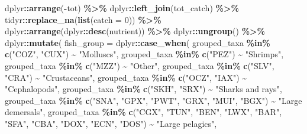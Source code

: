 \documentclass[
]{book}
\newenvironment{Shaded}{\begin{snugshade}}{\end{snugshade}}
\newcommand{\AttributeTok}[1]{\textcolor[rgb]{0.13,0.29,0.53}{#1}}
\newcommand{\DecValTok}[1]{\textcolor[rgb]{0.00,0.00,0.81}{#1}}
\newcommand{\FunctionTok}[1]{\textcolor[rgb]{0.13,0.29,0.53}{\textbf{#1}}}
\newcommand{\NormalTok}[1]{#1}
\newcommand{\SpecialCharTok}[1]{\textcolor[rgb]{0.81,0.36,0.00}{\textbf{#1}}}
\newcommand{\StringTok}[1]{\textcolor[rgb]{0.31,0.60,0.02}{#1}}
\begin{document}
\begin{Shaded}
\begin{Highlighting}[]
\NormalTok{  dplyr}\SpecialCharTok{::}\FunctionTok{arrange}\NormalTok{(}\SpecialCharTok{{-}}\NormalTok{tot) }\SpecialCharTok{\%\textgreater{}\%}
\NormalTok{  dplyr}\SpecialCharTok{::}\FunctionTok{left\_join}\NormalTok{(tot\_catch) }\SpecialCharTok{\%\textgreater{}\%}
\NormalTok{  tidyr}\SpecialCharTok{::}\FunctionTok{replace\_na}\NormalTok{(}\FunctionTok{list}\NormalTok{(}\AttributeTok{catch =} \DecValTok{0}\NormalTok{)) }\SpecialCharTok{\%\textgreater{}\%}
\NormalTok{  dplyr}\SpecialCharTok{::}\FunctionTok{arrange}\NormalTok{(dplyr}\SpecialCharTok{::}\FunctionTok{desc}\NormalTok{(nutrient)) }\SpecialCharTok{\%\textgreater{}\%}
\NormalTok{  dplyr}\SpecialCharTok{::}\FunctionTok{ungroup}\NormalTok{() }\SpecialCharTok{\%\textgreater{}\%}
\NormalTok{  dplyr}\SpecialCharTok{::}\FunctionTok{mutate}\NormalTok{(}
    \AttributeTok{fish\_group =}\NormalTok{ dplyr}\SpecialCharTok{::}\FunctionTok{case\_when}\NormalTok{(}
\NormalTok{      grouped\_taxa }\SpecialCharTok{\%in\%} \FunctionTok{c}\NormalTok{(}\StringTok{"COZ"}\NormalTok{, }\StringTok{"CUX"}\NormalTok{) }\SpecialCharTok{\textasciitilde{}} \StringTok{"Molluscs"}\NormalTok{,}
\NormalTok{      grouped\_taxa }\SpecialCharTok{\%in\%} \FunctionTok{c}\NormalTok{(}\StringTok{"PEZ"}\NormalTok{) }\SpecialCharTok{\textasciitilde{}} \StringTok{"Shrimps"}\NormalTok{,}
\NormalTok{      grouped\_taxa }\SpecialCharTok{\%in\%} \FunctionTok{c}\NormalTok{(}\StringTok{"MZZ"}\NormalTok{) }\SpecialCharTok{\textasciitilde{}} \StringTok{"Other"}\NormalTok{,}
\NormalTok{      grouped\_taxa }\SpecialCharTok{\%in\%} \FunctionTok{c}\NormalTok{(}\StringTok{"SLV"}\NormalTok{, }\StringTok{"CRA"}\NormalTok{) }\SpecialCharTok{\textasciitilde{}} \StringTok{"Crustaceans"}\NormalTok{,}
\NormalTok{      grouped\_taxa }\SpecialCharTok{\%in\%} \FunctionTok{c}\NormalTok{(}\StringTok{"OCZ"}\NormalTok{, }\StringTok{"IAX"}\NormalTok{) }\SpecialCharTok{\textasciitilde{}} \StringTok{"Cephalopods"}\NormalTok{,}
\NormalTok{      grouped\_taxa }\SpecialCharTok{\%in\%} \FunctionTok{c}\NormalTok{(}\StringTok{"SKH"}\NormalTok{, }\StringTok{"SRX"}\NormalTok{) }\SpecialCharTok{\textasciitilde{}} \StringTok{"Sharks and rays"}\NormalTok{,}
\NormalTok{      grouped\_taxa }\SpecialCharTok{\%in\%} \FunctionTok{c}\NormalTok{(}\StringTok{"SNA"}\NormalTok{, }\StringTok{"GPX"}\NormalTok{, }\StringTok{"PWT"}\NormalTok{, }\StringTok{"GRX"}\NormalTok{, }\StringTok{"MUI"}\NormalTok{, }\StringTok{"BGX"}\NormalTok{) }\SpecialCharTok{\textasciitilde{}} \StringTok{"Large demersals"}\NormalTok{,}
\NormalTok{      grouped\_taxa }\SpecialCharTok{\%in\%} \FunctionTok{c}\NormalTok{(}\StringTok{"CGX"}\NormalTok{, }\StringTok{"TUN"}\NormalTok{, }\StringTok{"BEN"}\NormalTok{, }\StringTok{"LWX"}\NormalTok{, }\StringTok{"BAR"}\NormalTok{, }\StringTok{"SFA"}\NormalTok{, }\StringTok{"CBA"}\NormalTok{, }\StringTok{"DOX"}\NormalTok{, }\StringTok{"ECN"}\NormalTok{, }\StringTok{"DOS"}\NormalTok{) }\SpecialCharTok{\textasciitilde{}} \StringTok{"Large pelagics"}\NormalTok{,}

\end{Highlighting}
\end{Shaded}
\end{document}
